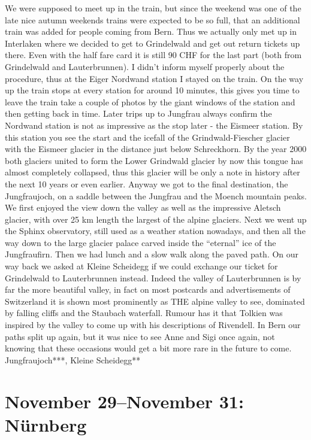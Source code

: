 We were supposed to meet up in the train, but since the weekend was one of the late nice autumn weekends trains were expected to be so full, that an additional train was added for people coming from Bern. Thus we actually only met up in Interlaken where we decided to get to Grindelwald and get out return tickets up there. Even with the half fare card it is still 90 CHF for the last part (both from Grindelwald and Lauterbrunnen). I didn't inform myself properly about the procedure, thus at the Eiger Nordwand station I stayed on the train. On the way up the train stops at every station for around 10 minutes, this gives you time to leave the train take a couple of photos by the giant windows of the station and then getting back in time. Later trips up to Jungfrau always confirm the Nordwand station is not as impressive as the stop later - the Eismeer station. By this station you see the start and the icefall of the Grindwald-Fiescher glacier with the Eismeer glacier in the distance just below Schreckhorn. By the year 2000 both glaciers united to form the Lower Grindwald glacier by now this tongue has almost completely collapsed, thus this glacier will be only a note in history after the next 10 years or even earlier. Anyway we got to the final destination, the Jungfraujoch, on a saddle between the Jungfrau and the Moench mountain peaks. We first enjoyed the view down the valley as well as the impressive Aletsch glacier, with over 25 km length the largest of the alpine glaciers. Next we went up the Sphinx observatory, still used as a weather station nowadays, and then all the way down to the large glacier palace carved inside the ``eternal'' ice of the Jungfraufirn. Then we had lunch and a slow walk along the paved path. On our way back we asked at Kleine Scheidegg if we could exchange our ticket for Grindelwald to Lauterbrunnen instead. Indeed the valley of Lauterbrunnen is by far the more beautiful valley, in fact on most postcards and advertisements of Switzerland it is shown most prominently as THE alpine valley to see, dominated by falling cliffs and the Staubach waterfall. Rumour has it that Tolkien was inspired by the valley to come up with his descriptions of Rivendell. In Bern our paths split up again, but it was nice to see Anne and Sigi once again, not knowing that these occasions would get a bit more rare in the future to come.\\

Jungfraujoch***, Kleine Scheidegg**

\section{November 29--November 31: N\"urnberg}
\label{2008:Nuernberg}

